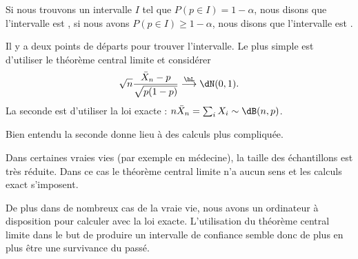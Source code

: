 Si nous trouvons un intervalle \( I\) tel que \( P(p\in I)=1-\alpha\), nous disons que l'intervalle est , si nous avons \( P(p\in I)\geq 1-\alpha\), nous disons que l'intervalle est .

Il y a deux points de départs pour trouver l'intervalle. Le plus simple est d'utiliser le théorème central limite et considérer
\begin{equation}
	\sqrt{n}\frac{ \bar X_n-p }{ \sqrt{p(1-p)} }\stackrel{\hL}{\longrightarrow}\dN(0,1).
\end{equation}
La seconde est d'utiliser la loi exacte : \( n\bar X_n=\sum_i X_i\sim \dB(n,p)\).

Bien entendu la seconde donne lieu à des calculs plus compliquée.

\begin{remark}
	Dans certaines vraies vies (par exemple en médecine), la taille des échantillons est très réduite. Dans ce cas le théorème central limite n'a aucun sens et les calculs exact s'imposent.

	De plus dans de nombreux cas de la vraie vie, nous avons un ordinateur à disposition pour calculer avec la loi exacte. L'utilisation du théorème central limite dans le but de produire un intervalle de confiance semble donc de plus en plus être une survivance du passé.
\end{remark}

